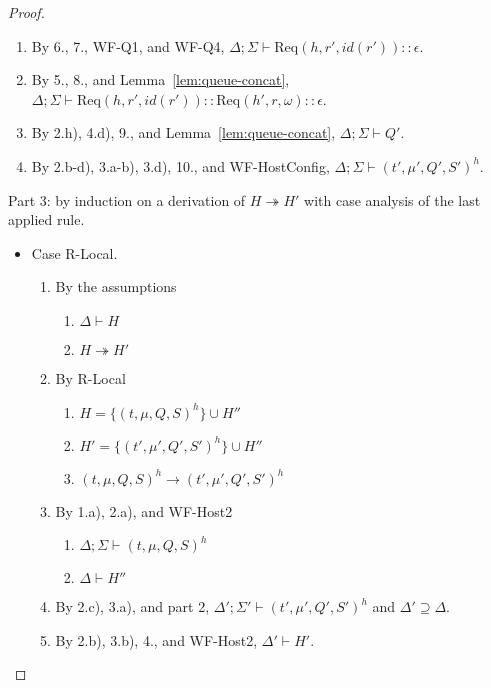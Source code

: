 \documentclass{article}
\theoremstyle{definition}
\newcommand{\Req}[3]{\text{Req}(#1, #2, #3)}
\begin{document}
\begin{proof}
\begin{itemize}
\begin{enumerate}
\item By 6., 7., WF-Q1, and WF-Q4, $\Delta ; \Sigma \vdash {\Req h {r'} {id(r')}} :: \epsilon$.
\item By 5., 8., and Lemma~\ref{lem:queue-concat}, $\Delta ; \Sigma \vdash {\Req h {r'} {id(r')}} :: {\Req {h'} r \omega} :: \epsilon$.
\item By 2.h), 4.d), 9., and Lemma~\ref{lem:queue-concat}, $\Delta ; \Sigma \vdash Q'$.
\item By 2.b-d), 3.a-b), 3.d), 10., and WF-HostConfig, $\Delta ; \Sigma \vdash (t', \mu', Q', S')^h$.
\end{enumerate}

\end{itemize}

Part 3: by induction on a derivation of $H \twoheadrightarrow H'$ with case analysis of the last applied rule.

\begin{itemize}
\item Case R-Local.
\begin{enumerate}
\item By the assumptions
  \begin{enumerate}[label=(\alph*)]
  \item $\Delta \vdash H$
  \item $H \twoheadrightarrow H'$
  \end{enumerate}
\item By R-Local
  \begin{enumerate}[label=(\alph*)]
  \item $H = \{ (t, \mu, Q, S)^h \} \cup H''$
  \item $H' = \{ (t', \mu', Q', S')^h \} \cup H''$
  \item $(t, \mu, Q, S)^h \longrightarrow (t', \mu', Q', S')^h$
  \end{enumerate}
\item By 1.a), 2.a), and WF-Host2
  \begin{enumerate}[label=(\alph*)]
  \item $\Delta ; \Sigma \vdash (t, \mu, Q, S)^h$
  \item $\Delta \vdash H''$
  \end{enumerate}
\item By 2.c), 3.a), and part 2, $\Delta' ; \Sigma' \vdash (t', \mu', Q', S')^h$ and $\Delta' \supseteq \Delta$.
\item By 2.b), 3.b), 4., and WF-Host2, $\Delta' \vdash H'$.
\end{enumerate}


\end{itemize}
\end{proof}
\end{document}
